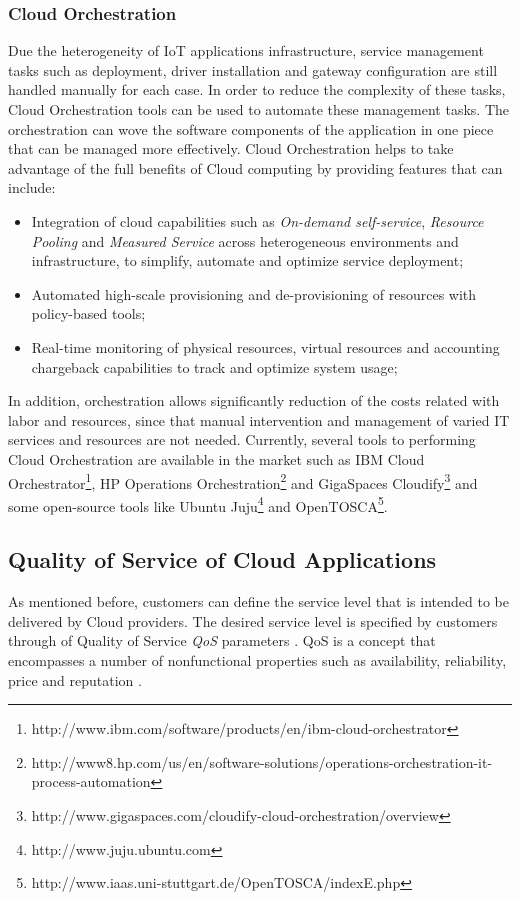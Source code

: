 \subsubsection{Cloud Orchestration}
\label{subs:cloud_orchestration}
Due the heterogeneity of IoT applications infrastructure, service management tasks
such as deployment, driver installation and gateway configuration are still handled
manually for each case. In order to reduce the complexity of these tasks, Cloud Orchestration
tools can be used to automate these management tasks. The orchestration can wove the
software components of the application in one piece that can be managed more effectively.
Cloud Orchestration helps to take advantage of the full benefits of Cloud computing by
providing features that can include:
\begin{itemize}
  \item Integration of cloud capabilities \cite{mell2011nist} such as \textit{On-demand self-service},
  \textit{Resource Pooling} and \textit{Measured Service} across heterogeneous environments and
  infrastructure, to simplify, automate and optimize service deployment;
  \item Automated high-scale provisioning and de-provisioning of resources with policy-based tools;
  \item Real-time monitoring of physical resources, virtual resources and accounting chargeback
  capabilities to track and optimize system usage;
\end{itemize}
In addition, orchestration allows significantly reduction of the costs related with labor
and resources, since that manual intervention and management of varied IT services and resources
are not needed. Currently, several tools to performing Cloud Orchestration are available
in the market such as IBM Cloud Orchestrator\footnote{http://www.ibm.com/software/products/en/ibm-cloud-orchestrator},
HP Operations Orchestration\footnote{http://www8.hp.com/us/en/software-solutions/operations-orchestration-it-process-automation}
and GigaSpaces Cloudify\footnote{http://www.gigaspaces.com/cloudify-cloud-orchestration/overview}
and some open-source tools like Ubuntu Juju\footnote{http://www.juju.ubuntu.com}
and OpenTOSCA\footnote{http://www.iaas.uni-stuttgart.de/OpenTOSCA/indexE.php}.
\subsection{Quality of Service of Cloud Applications}
\label{sub:qos_cloud}
As mentioned before, customers can define the service level that is intended to be
delivered by Cloud providers. The desired service level is specified by customers
through of Quality of Service \textit{QoS} parameters \cite{vaquero2008break}.
QoS is a concept that encompasses a number of nonfunctional properties such as
availability, reliability, price and reputation \cite{o2002s}.\\

